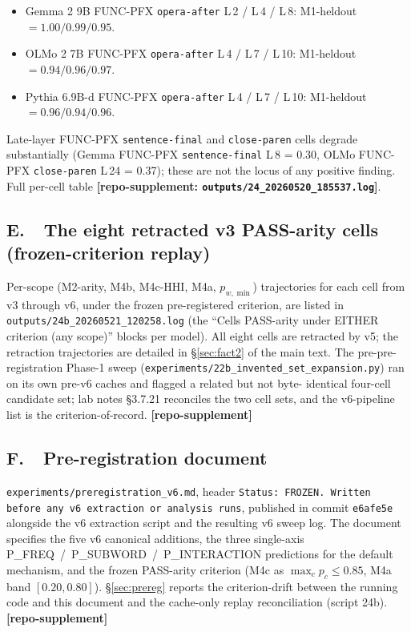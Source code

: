 \documentclass[11pt,letterpaper]{article}
\newcommand{\Ma}{M2-arity}
\newcommand{\Mbfb}{M4b}
\newcommand{\Mbfc}{M4c}
\newcommand{\pwmin}{\ensuremath{p_{w,\min}}}
\begin{document}
\begin{itemize}
  \item Gemma 2 9B FUNC-PFX \texttt{opera-after} L\,2 / L\,4 / L\,8:
    M1-heldout $= 1.00 / 0.99 / 0.95$.
  \item OLMo 2 7B FUNC-PFX \texttt{opera-after} L\,4 / L\,7 / L\,10:
    M1-heldout $= 0.94 / 0.96 / 0.97$.
  \item Pythia 6.9B-d FUNC-PFX \texttt{opera-after} L\,4 / L\,7 / L\,10:
    M1-heldout $= 0.96 / 0.94 / 0.96$.
\end{itemize}

Late-layer FUNC-PFX \texttt{sentence-final} and \texttt{close-paren}
cells degrade substantially (Gemma FUNC-PFX \texttt{sentence-final}
L\,8 = 0.30, OLMo FUNC-PFX \texttt{close-paren} L\,24 = 0.37); these
are not the locus of any positive finding. Full per-cell table
\textbf{[repo-supplement: \texttt{outputs/24\_20260520\_185537.log}]}.

\subsection*{E.\ \ The eight retracted v3 PASS-arity cells (frozen-criterion replay)}
Per-scope (\Ma{}, \Mbfb{}, \Mbfc{}-HHI,
M4a, \pwmin{}) trajectories for each cell from v3 through v6, under
the frozen pre-registered criterion, are listed in
\texttt{outputs/24b\_20260521\_120258.log} (the ``Cells PASS-arity
under EITHER criterion (any scope)'' blocks per model). All eight
cells are retracted by v5; the retraction trajectories are detailed
in \S\ref{sec:fact2} of the main text. The pre-pre-registration
Phase-1 sweep (\texttt{experiments/22b\_invented\_set\_expansion.py})
ran on its own pre-v6 caches and flagged a related but not byte-
identical four-cell candidate set; lab notes \S3.7.21 reconciles the
two cell sets, and the v6-pipeline list is the
criterion-of-record. \textbf{[repo-supplement]}

\subsection*{F.\ \ Pre-registration document}
\texttt{experiments/preregistration\_v6.md}, header \texttt{Status:
FROZEN. Written before any v6 extraction or analysis runs},
published in commit \texttt{e6afe5e} alongside the v6 extraction
script and the resulting v6 sweep log. The document specifies the
five v6 canonical additions, the three single-axis
P\_FREQ~/~P\_SUBWORD~/~P\_INTERACTION predictions for the default
mechanism, and the frozen PASS-arity criterion (\Mbfc{} as
$\max_c p_c \leq 0.85$, M4a band $[0.20, 0.80]$). \S\ref{sec:prereg}
reports the criterion-drift between the running code and this
document and the cache-only replay reconciliation (script 24b).
\textbf{[repo-supplement]}
\end{document}

